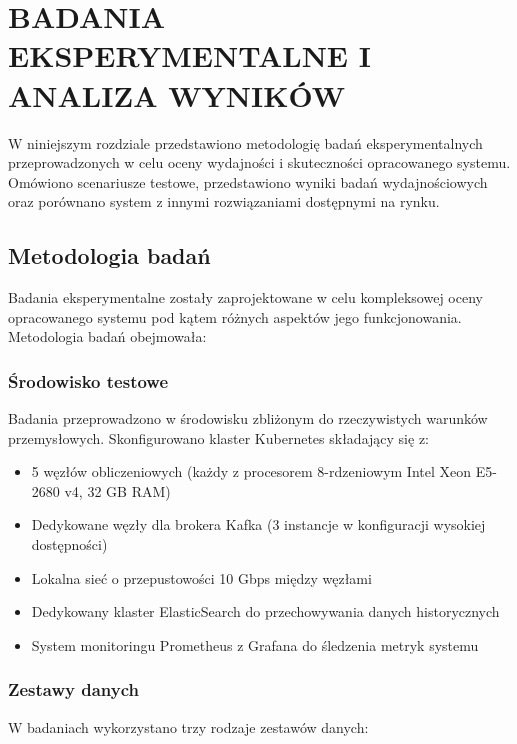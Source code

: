 \section{BADANIA EKSPERYMENTALNE I ANALIZA WYNIKÓW}
\label{sec:badania_eksperymentalne}

W niniejszym rozdziale przedstawiono metodologię badań eksperymentalnych przeprowadzonych w celu oceny wydajności i skuteczności opracowanego systemu. Omówiono scenariusze testowe, przedstawiono wyniki badań wydajnościowych oraz porównano system z innymi rozwiązaniami dostępnymi na rynku.

\subsection{Metodologia badań}
\label{subsec:metodologia_badan}

Badania eksperymentalne zostały zaprojektowane w celu kompleksowej oceny opracowanego systemu pod kątem różnych aspektów jego funkcjonowania. Metodologia badań obejmowała:

\subsubsection{Środowisko testowe}
\label{subsubsec:srodowisko_testowe}

Badania przeprowadzono w środowisku zbliżonym do rzeczywistych warunków przemysłowych. Skonfigurowano klaster Kubernetes składający się z:

\begin{itemize}
    \item 5 węzłów obliczeniowych (każdy z procesorem 8-rdzeniowym Intel Xeon E5-2680 v4, 32 GB RAM)
    \item Dedykowane węzły dla brokera Kafka (3 instancje w konfiguracji wysokiej dostępności)
    \item Lokalna sieć o przepustowości 10 Gbps między węzłami
    \item Dedykowany klaster ElasticSearch do przechowywania danych historycznych
    \item System monitoringu Prometheus z Grafana do śledzenia metryk systemu
\end{itemize}

\subsubsection{Zestawy danych}
\label{subsubsec:zestawy_danych}

W badaniach wykorzystano trzy rodzaje zestawów danych:

